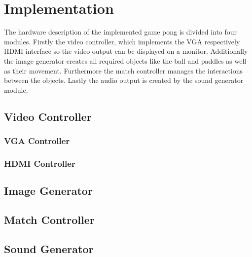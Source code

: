 \section{Implementation}
The hardware description of the implemented game pong is divided into four modules. Firstly the video controller, which implements the VGA respectively HDMI interface so the video output can be displayed on a monitor. Additionally the image generator creates all required objects like the ball and paddles as well as their movement. Furthermore the match controller manages the interactions between the objects. Lastly the audio output is created by the sound generator module.
	\subsection{Video Controller}
        \subsubsection{VGA Controller}
        \subsubsection{HDMI Controller}
    \subsection{Image Generator}
    \subsection{Match Controller}
    \subsection{Sound Generator}
